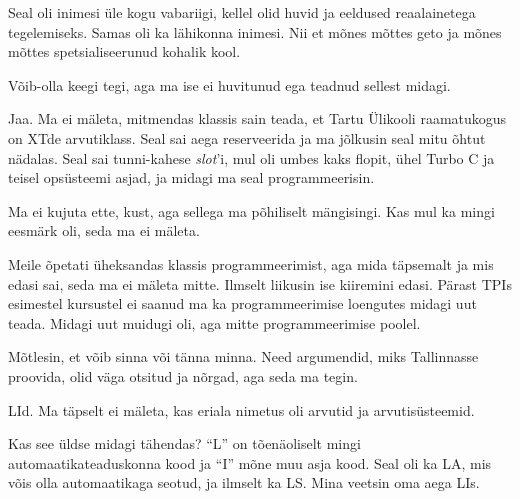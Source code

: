 
Seal oli inimesi üle kogu vabariigi, kellel olid  
huvid ja eeldused reaalainetega tegelemiseks. Samas oli ka
lähikonna inimesi. Nii et mõnes mõttes geto ja mõnes mõttes
spetsialiseerunud kohalik kool.


Võib-olla keegi tegi, aga ma ise ei huvitunud ega teadnud sellest midagi. 


Jaa. Ma ei mäleta, mitmendas klassis sain teada, et 
Tartu Ülikooli raamatukogus on 
XTde arvutiklass. Seal sai aega reserveerida 
ja ma jõlkusin seal mitu õhtut nädalas. Seal 
sai tunni-kahese \emph{slot}'i, mul oli umbes kaks flopit, 
ühel Turbo C ja teisel 
opsüsteemi asjad, ja midagi ma seal programmeerisin. 


Ma ei kujuta ette, kust, aga sellega ma põhiliselt mängisingi.
Kas mul ka mingi eesmärk oli, seda ma ei mäleta.



Meile õpetati üheksandas klassis programmeerimist, aga mida täpsemalt ja mis edasi 
sai, seda ma ei mäleta mitte. Ilmselt liikusin ise
kiiremini edasi. Pärast TPIs 
 esimestel kursustel ei saanud ma ka programmeerimise loengutes 
midagi uut teada. Midagi uut muidugi oli, aga mitte programmeerimise poolel. 



Mõtlesin, et võib sinna või tänna minna. Need argumendid, miks Tallinnasse proovida, olid 
väga otsitud ja nõrgad, aga seda ma tegin. 


LId. Ma täpselt ei mäleta, kas eriala nimetus oli arvutid ja 
arvutisüsteemid.


Kas see üldse midagi tähendas? \enquote{L} on tõenäoliselt mingi 
automaatikateaduskonna kood ja \enquote{I} mõne muu asja kood. 
Seal oli ka LA, mis võis olla automaatikaga seotud, ja ilmselt ka LS. Mina veetsin oma aega LIs.

